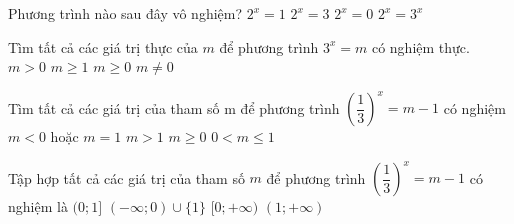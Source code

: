 

\begin{ex}%
	Phương trình nào sau đây  vô nghiệm?
	 \choice
		{$2^x=1$} 
		 {$2^x=3$}
		{\True  $2^x=0$}
		{$2^x=3^x$} 
\end{ex}

\begin{ex}%
	Tìm tất cả các giá trị thực của $m$ để phương trình $3^x=m$ có  nghiệm thực.
	\choice 
		 {\True $m>0$}
		{$m\geq 1$} 
		{$m\geq 0$} 
		{$m\neq 0$} 
\end{ex}

\begin{ex}%
	Tìm tất cả các giá trị của tham số m để  phương trình $\left(\dfrac{1}{3}\right)^x=m-1$ có nghiệm
	 \choice
		 {$m<0$ hoặc $m=1$}
		 {\True $m>1$}
		{$m\geq  0$}
		{$0<m\leq 1$} 
\end{ex}

\begin{ex}%
	Tập hợp tất cả các giá trị của tham số $m$ để phương trình $\left(\dfrac{1}{3}\right)^x=m-1$ có nghiệm là 
	 \choice
		{$  (0;1]$}
		 {$(-\infty; 0) \cup \{1 \}$}
		{$[0; +\infty)$} 
		{\True  $(1; +\infty)$}
\end{ex}



